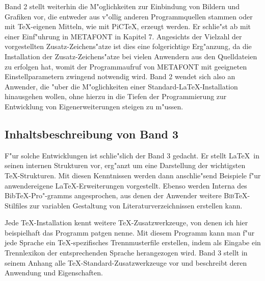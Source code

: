 \documentclass[twoside]{report}
\begin{document}
Band 2 stellt weiterhin die M"oglichkeiten zur Einbindung von Bildern und
Grafiken vor, die entweder aus v"ollig anderen Programmquellen stammen oder
mit \TeX-eigenen Mitteln, wie mit PiC\TeX, erzeugt werden.
Er schlie"st ab mit einer Einf"uhrung in METAFONT in Kapitel 7. Angesichts der
Vielzahl der vorgestellten Zusatz-Zeichens"atze ist dies eine folgerichtige
Erg"anzung, da die Installation der Zusatz-Zeichens"atze bei vielen Anwendern
aus den Quelldateien zu erfolgen hat, womit der Programmaufruf von METAFONT
mit geeigneten Einstellparametern zwingend notwendig wird.
Band 2 wendet sich also an Anwender, die "uber die M"oglichkeiten 
einer Standard-\LaTeX-Installation hinausgehen wollen, ohne hierzu
in die Tiefen der Programmierung zur Entwicklung von Eigenerweiterungen
steigen zu m"ussen.

\subsection{Inhaltsbeschreibung von Band 3}
F"ur solche Entwicklungen ist schlie"slich der Band 3 gedacht. Er stellt
\LaTeX\ in seinen internen Strukturen vor, erg"anzt um eine Darstellung
der wichtigsten \TeX-Strukturen. Mit diesen Kenntnissen werden dann
anschlie"send Beispiele f"ur anwendereigene \LaTeX-Erweiterungen vorgestellt.
Ebenso werden Interna des Bib\TeX-Pro"-gramms angesprochen, aus denen
der Anwender weitere \textsc{Bib}\TeX-Stilfiles zur variablen Gestaltung
von Literaturverzeichnissen erstellen kann.

Jede \TeX-Installation kennt weitere  \TeX-Zusatzwerkzeuge, von denen ich hier
beispielhaft das Programm patgen nenne. Mit diesem Programm kann man
f"ur jede Sprache ein \TeX-spezifisches Trennmusterfile erstellen,
indem als Eingabe ein Trennlexikon der entsprechenden Sprache herangezogen
wird. Band 3 stellt in seinem Anhang alle \TeX-Standard-Zusatzwerkzeuge vor und
beschreibt deren Anwendung und Eigenschaften.
\end{document}
